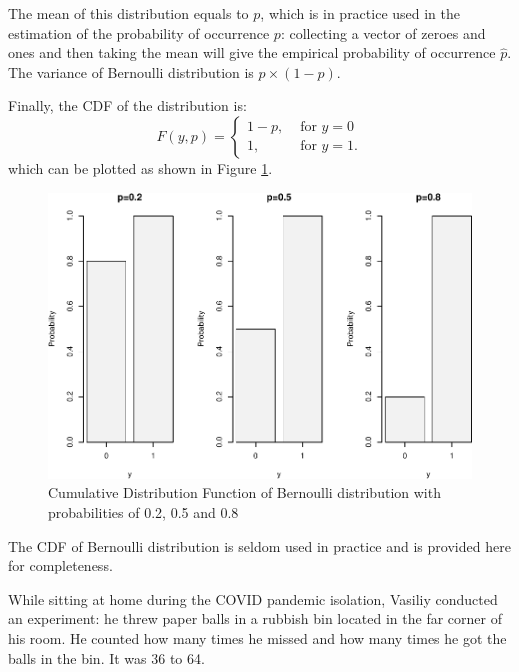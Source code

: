 \documentclass[
]{book}
\theoremstyle{definition}
\theoremstyle{definition}
\theoremstyle{definition}
\theoremstyle{definition}
\theoremstyle{remark}
\begin{document}
The mean of this distribution equals to \(p\), which is in practice used in the estimation of the probability of occurrence \(p\): collecting a vector of zeroes and ones and then taking the mean will give the empirical probability of occurrence \(\hat{p}\). The variance of Bernoulli distribution is \(p\times (1-p)\).

Finally, the CDF of the distribution is:
\begin{equation}
    F(y, p) = \left\{ \begin{aligned}
                            1-p, & \text{ for } y=0 \\
                            1,   & \text{ for } y=1 .
                    \end{aligned} \right.
    \label{eq:BernoulliCDF}
\end{equation}
which can be plotted as shown in Figure \ref{fig:bernoulliCDF}.

\begin{figure}
\centering
\includegraphics{Svetunkov---Statistics-for-Business-Analytics_files/figure-latex/bernoulliCDF-1.pdf}
\caption{\label{fig:bernoulliCDF}Cumulative Distribution Function of Bernoulli distribution with probabilities of 0.2, 0.5 and 0.8}
\end{figure}

The CDF of Bernoulli distribution is seldom used in practice and is provided here for completeness.

While sitting at home during the COVID pandemic isolation, Vasiliy conducted an experiment: he threw paper balls in a rubbish bin located in the far corner of his room. He counted how many times he missed and how many times he got the balls in the bin. It was 36 to 64.
\end{document}
